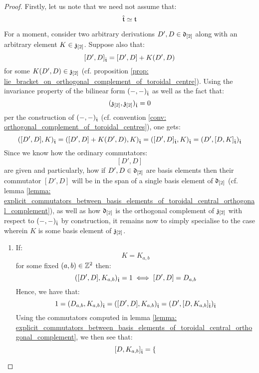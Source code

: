             \begin{proof}
                Firstly, let us note that we need not assume that:
                    $$\hat{\mathfrak{t}} \simeq \mathfrak{t}$$
            
                For a moment, consider two arbitrary derivations $D', D \in \d_{[2]}$ along with an arbitrary element $K \in \z_{[2]}$. Suppose also that:
                    $$[D', D]_{\extendedtoroidal} = [D', D] + K(D', D)$$
                for some $K(D', D) \in \z_{[2]}$ (cf. proposition \ref{prop: lie_bracket_on_orthogonal_complement_of_toroidal_centre}). Using the invariance property of the bilinear form $(-, -)_{\extendedtoroidal}$ as well as the fact that:
                    $$(\z_{[2]}, \z_{[2]})_{\extendedtoroidal} = 0$$
                per the construction of $(-, -)_{\extendedtoroidal}$ (cf. convention \ref{conv: orthogonal_complement_of_toroidal_centres}), one gets:
                    $$([D', D], K)_{\extendedtoroidal} = ([D', D] + K(D', D), K)_{\extendedtoroidal} = ([D', D]_{\extendedtoroidal}, K)_{\extendedtoroidal} = (D', [D, K]_{\extendedtoroidal})_{\extendedtoroidal}$$
                Since we know how the ordinary commutators:
                    $$[D', D]$$
                are given and particularly, how if $D', D \in \d_{[2]}$ are basis elements then their commutator $[D', D]$ will be in the span of a single basis element of $\d_{[2]}$ (cf. lemma \ref{lemma: explicit_commutators_between_basis_elements_of_toroidal_central_orthogonal_complement}), as well as how $\d_{[2]}$ is the orthogonal complement of $\z_{[2]}$ with respect to $(-, -)_{\extendedtoroidal}$ by construction, it remains now to simply specialise to the case wherein $K$ is some basis element of $\z_{[2]}$. 
                \begin{enumerate}
                    \item If:
                        $$K = K_{a, b}$$
                    for some fixed $(a, b) \in \Z^2$ then:
                        $$([D', D], K_{a, b})_{\extendedtoroidal} = 1 \iff [D', D] = D_{a, b}$$
                    Hence, we have that:
                        $$1 = (D_{a, b}, K_{a, b})_{\extendedtoroidal} = ([D', D], K_{a, b})_{\extendedtoroidal} = (D', [D, K_{a, b}]_{\extendedtoroidal})_{\extendedtoroidal}$$
                    Using the commutators computed in lemma \ref{lemma: explicit_commutators_between_basis_elements_of_toroidal_central_orthogonal_complement}, we then see that:
                        $$
                            [D, K_{a, b}]_{\extendedtoroidal} =
                            \begin{cases}

\end{cases}$$
\end{enumerate}
\end{proof}
